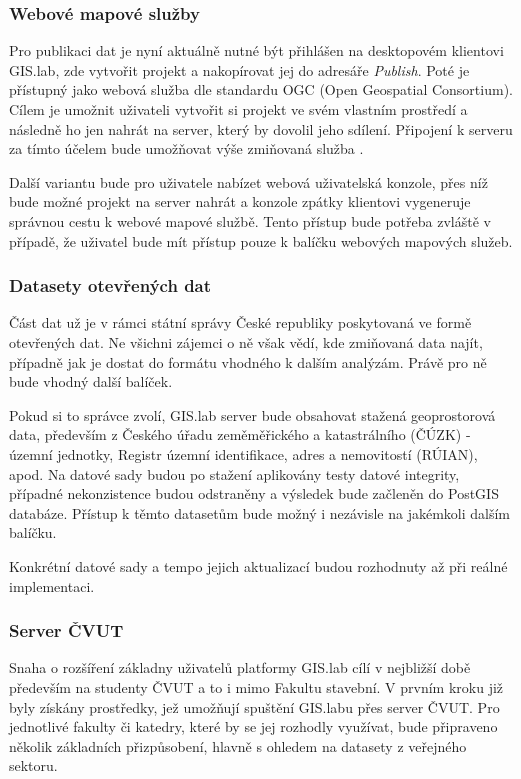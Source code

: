 \subsubsection{Webové mapové služby}
Pro publikaci dat je nyní aktuálně nutné být přihlášen na desktopovém
klientovi GIS.lab, zde vytvořit projekt a nakopírovat jej do adresáře
\textit{Publish}. Poté je přístupný jako webová služba dle standardu
OGC (Open Geospatial Consortium). Cílem je umožnit uživateli vytvořit
si projekt ve svém vlastním prostředí a následně ho jen nahrát na
server, který by dovolil jeho sdílení. Připojení k serveru za tímto
účelem bude umožňovat výše zmiňovaná služba .

Další variantu bude pro uživatele nabízet webová uživatelská konzole,
přes níž bude možné projekt na server nahrát a konzole zpátky
klientovi vygeneruje správnou cestu k webové mapové službě. Tento
přístup bude potřeba zvláště v případě, že uživatel bude mít přístup
pouze k balíčku webových mapových služeb.

\subsubsection{Datasety otevřených dat}

Část dat už je v rámci státní správy České republiky poskytovaná ve
formě otevřených dat. Ne všichni zájemci o ně však vědí, kde zmiňovaná
data najít, případně jak je dostat do formátu vhodného k dalším
analýzám. Právě pro ně bude vhodný další balíček.

Pokud si to správce zvolí, GIS.lab server bude obsahovat stažená
geoprostorová data, především z Českého úřadu zeměměřického a
katastrálního (ČÚZK) - územní jednotky, Registr územní identifikace,
adres a nemovitostí (RÚIAN), apod. Na datové sady budou po stažení
aplikovány testy datové integrity, případné nekonzistence budou
odstraněny a výsledek bude začleněn do PostGIS databáze. Přístup 
k těmto datasetům bude možný i nezávisle na jakémkoli dalším balíčku.

Konkrétní datové sady a tempo jejich aktualizací budou rozhodnuty až
při reálné implementaci.

\subsubsection{Server ČVUT}
Snaha o rozšíření základny uživatelů platformy GIS.lab cílí v
nejbližší době především na studenty ČVUT a to i mimo Fakultu
stavební. V prvním kroku již byly získány prostředky, jež umožňují
spuštění GIS.labu přes server ČVUT. Pro jednotlivé fakulty či katedry,
které by se jej rozhodly využívat, bude připraveno několik základních
přizpůsobení, hlavně s ohledem na datasety z veřejného sektoru.

